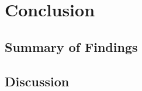 \newpage
\section{Conclusion}
\label{sec:conclusion}

\subsection{Summary of Findings}
\label{subsec:summary}

\subsection{Discussion}
\label{subsec:discussion}
